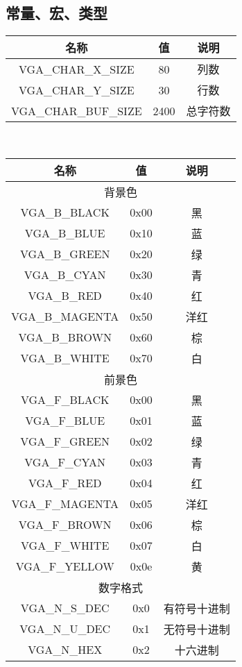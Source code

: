 \subsection{常量、宏、类型}
\noindent\begin{tabular}{|c|c|c|}
    \hline
    名称 & 值 & 说明\\\hline
    VGA\_CHAR\_X\_SIZE & 80 & 列数\\\hline
    VGA\_CHAR\_Y\_SIZE & 30 & 行数\\\hline
    VGA\_CHAR\_BUF\_SIZE & 2400 & 总字符数\\\hline
\end{tabular}\\
\begin{tabular}{|c|c|c|}
    \hline
    名称 & 值 & 说明\\\hline
    \multicolumn{3}{|c|}{背景色}\\\hline
    VGA\_B\_BLACK & 0x00 & 黑\\\hline
    VGA\_B\_BLUE & 0x10 & 蓝\\\hline
    VGA\_B\_GREEN & 0x20 & 绿\\\hline
    VGA\_B\_CYAN & 0x30 & 青\\\hline
    VGA\_B\_RED & 0x40 & 红\\\hline
    VGA\_B\_MAGENTA & 0x50 & 洋红\\\hline
    VGA\_B\_BROWN & 0x60 & 棕\\\hline
    VGA\_B\_WHITE & 0x70 & 白\\\hline
    \multicolumn{3}{|c|}{前景色}\\\hline
    VGA\_F\_BLACK & 0x00 & 黑\\\hline
    VGA\_F\_BLUE & 0x01 & 蓝\\\hline
    VGA\_F\_GREEN & 0x02 & 绿\\\hline
    VGA\_F\_CYAN & 0x03 & 青\\\hline
    VGA\_F\_RED & 0x04 & 红\\\hline
    VGA\_F\_MAGENTA & 0x05 & 洋红\\\hline
    VGA\_F\_BROWN & 0x06 & 棕\\\hline
    VGA\_F\_WHITE & 0x07 & 白\\\hline
    VGA\_F\_YELLOW & 0x0e & 黄\\\hline
    \multicolumn{3}{|c|}{数字格式}\\\hline
    VGA\_N\_S\_DEC & 0x0 & 有符号十进制\\\hline
    VGA\_N\_U\_DEC & 0x1 & 无符号十进制\\\hline
    VGA\_N\_HEX & 0x2 & 十六进制\\\hline
\end{tabular}\\
